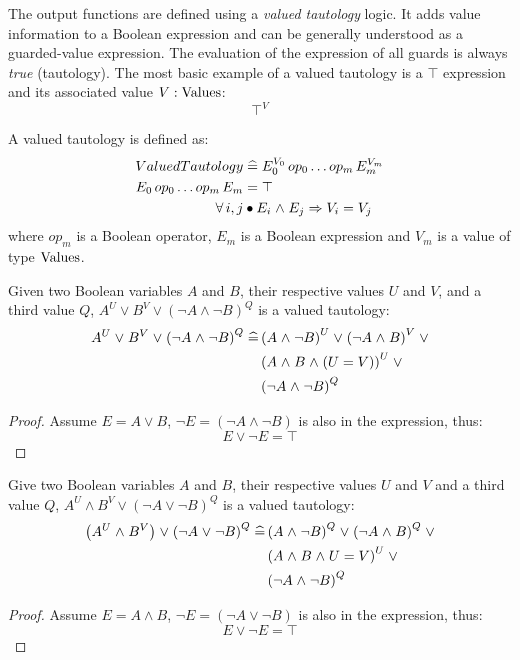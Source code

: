 The output functions are defined using a \emph{valued tautology} logic.
%
It adds value information to a Boolean expression and can be generally understood as a guarded-value expression. 
%
The evaluation of the expression of all guards is always \emph{true} (tautology).
%
The most basic example of a valued tautology is a $\top$ expression and its associated value $V : \mathrm{Values}$:
\[\top^V\]
\begin{definition}
\label{def:valued-tautology}
A valued tautology is defined as:
\begin{align*}
ValuedTautology & \defs E_0^{V_0} \mathop{op_0} \ldots \mathop{op_m} E_m^{V_m}
\\ E_0 \mathop{op_0} \ldots \mathop{op_m} E_m & = \top
\\ \forall i, j & \bullet E_i \land E_j \implies V_i = V_j
\end{align*}
%
where $op_m$ is a Boolean operator, $E_m$ is a Boolean expression and $V_m$ is a value of type $\mathrm{Values}$.
\end{definition}

\begin{lemma}
Given two Boolean variables $A$ and $B$, their respective values $U$ and $V$, and a third value $Q$, $A^U \lor B^V \lor \left(\lnot A \land \lnot B\right)^Q $ is a valued tautology:
\begin{align*}
A^U \mathrel{\vee} B^V \mathrel{\vee} \left(\neg A \mathrel{\wedge} \neg B\right)^Q \mathrel{\widehat{=}} & 
\left(A \mathrel{\wedge} \neg B\right)^U \mathrel{\vee}
\left(\neg A \mathrel{\wedge} B\right)^V \mathrel{\vee} 
\\&  \left(A \mathrel{\wedge} B \mathrel{\wedge} \left(U = V\right) \right)^U \mathrel{\vee}
\\&  \left(\neg A \mathrel{\wedge} \neg B\right)^Q
\end{align*}

\end{lemma}
\begin{proof}
Assume $E = A \lor B$, $\lnot E = \left(\lnot A \land \lnot B\right) $ is also in the expression, thus:
\[ E \lor \lnot E = \top \] 
\end{proof}


\begin{lemma}
Give two Boolean variables $A$ and $B$, their respective values $U$ and $V$ and a third value $Q$, $A^U \land B^V \lor \left(\lnot A \lor \lnot B\right)^Q $ is a valued tautology:
\begin{align*}
\left(A^U \mathrel{\wedge} B^V\right) \mathrel{\vee} \left(\neg A \mathrel{\vee} \neg B\right)^Q \mathrel{\widehat{=}} & 
\left(A \mathrel{\wedge} \neg B \right)^Q \mathrel{\vee}
\left(\neg A \mathrel{\wedge} B\right)^Q \mathrel{\vee}
\\&\left(A \mathrel{\wedge} B \mathrel{\wedge} U = V\right)^U \mathrel{\vee}
\\&\left(\neg A \mathrel{\wedge} \neg B\right)^Q
\end{align*}
\end{lemma}
\begin{proof}
Assume $E = A \land B$, $\lnot E = \left(\lnot A \lor \lnot B\right) $ is also in the expression, thus:
\[ E \lor \lnot E = \top \] 
\end{proof}

